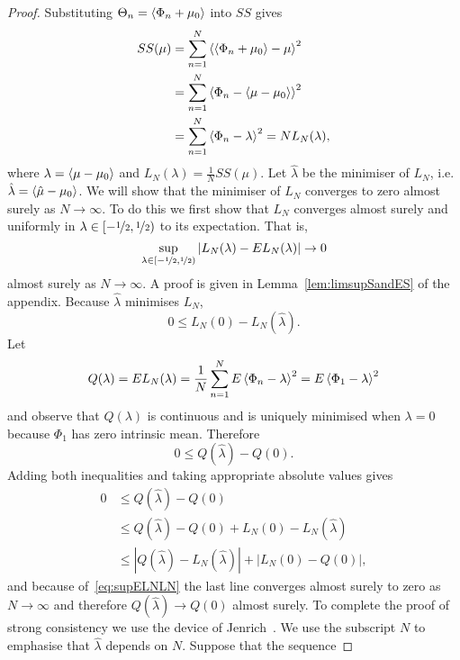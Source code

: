\documentclass[journal]{IEEEtran}
\begin{document}
\begin{proof}
Substituting $\Theta_n = \left< \Phi_n + \mu_0 \right>$ into $SS$ gives
\begin{align*}
SS(\mu) &= \sum_{n=1}^{N}{ \left< \left< \Phi_n + \mu_0 \right> - \mu \right>^2 } \\
&= \sum_{n=1}^{N}{ \left< \Phi_n - \left< \mu - \mu_0 \right> \right>^2 } \\
&= \sum_{n=1}^{N}{ \left< \Phi_n - \lambda \right>^2 } = NL_N(\lambda),
\end{align*}
where $\lambda = \left< \mu - \mu_0 \right>$ and $L_N(\lambda) = \tfrac{1}{N}SS(\mu)$. Let $\hat{\lambda}$ be the minimiser of $L_N$, i.e. $\hat{\lambda} = \left< \hat{\mu} - \mu_0 \right>$. We will show that the minimiser of $L_N$ converges to zero almost surely as $N \rightarrow \infty$. To do this we first show that $L_N$ converges almost surely and uniformly in $\lambda \in [-\nicefrac{1}{2}, \nicefrac{1}{2})$ to its expectation. That is,
\begin{equation}\label{eq:supELNLN}
\sup_{\lambda \in [-\nicefrac{1}{2}, \nicefrac{1}{2})}| L_N(\lambda) - EL_N(\lambda) | \rightarrow 0
\end{equation}
almost surely as $N \rightarrow \infty$. A proof is given in Lemma~\ref{lem:limsupSandES} of the appendix. %
Because $\hat{\lambda}$ minimises $L_N$,
\[
0 \leq L_N(0) - L_N(\hat{\lambda}).
\] 
Let
\[
Q(\lambda) = EL_N(\lambda) = \frac{1}{N}\sum_{n=1}^{N}E\left< \Phi_n - \lambda \right>^2 = E\left< \Phi_1 - \lambda \right>^2
\] 
and observe that $Q(\lambda)$ is continuous and is uniquely minimised when $\lambda = 0$ because $\Phi_1$ has zero intrinsic mean. Therefore
\[
0 \leq Q(\hat{\lambda}) - Q(0).
\]
Adding both inequalities and taking appropriate absolute values gives
\begin{align*}
0 &\leq Q(\hat{\lambda}) - Q(0) \\ 
& \leq Q(\hat{\lambda}) - Q(0) + L_N(0) - L_N(\hat{\lambda})\\
& \leq |Q(\hat{\lambda}) - L_N(\hat{\lambda})| + |L_N(0) - Q(0)|,
\end{align*}
and because of~\eqref{eq:supELNLN} the last line converges almost surely to zero as $N \rightarrow \infty$ and therefore $Q(\hat{\lambda}) \rightarrow Q(0)$ almost surely. To complete the proof of strong consistency we use the device of Jenrich~\cite{Jenrich_asymp_nonlin_ulln_1969}. We use the
subscript $N$ to emphasise that $\hat{\lambda}$ depends on $N.$ Suppose that the sequence

\end{proof}
\end{document}
